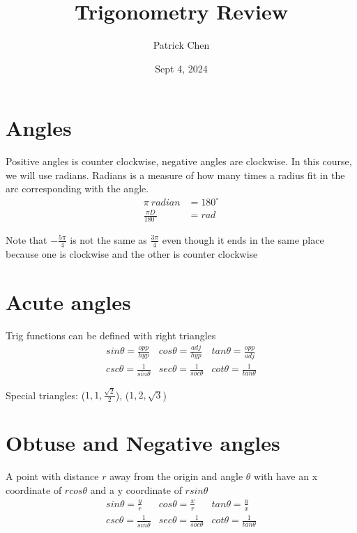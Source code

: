 \documentclass{article}
\title{Trigonometry Review}
\author{Patrick Chen}
\date{Sept 4, 2024}
\theoremstyle{mytheoremstyle}
\theoremstyle{mytheoremstyle}
\theoremstyle{myproblemstyle}
\begin{document}
    \maketitle
    \section*{Angles}
    Positive angles is counter clockwise, negative angles are clockwise. In this
    course, we will use radians. Radians is a measure of how many times a radius
    fit in the arc corresponding with the angle.
    \begin{align*}
        \pi\ radian &= 180^\circ \\
        \frac{\pi D}{180^\circ} &= rad
    \end{align*}

    Note that $-\frac{5\pi}{4}$ is not the same as $\frac{3\pi}{4}$ even though
    it ends in the same place because one is clockwise and the other is counter
    clockwise

    \section*{Acute angles}
    Trig functions can be defined with right triangles
    \begin{equation*}
        \begin{matrix}
            sin \theta = \frac{opp}{hyp} & cos \theta = \frac{adj}{hyp} & tan \theta = \frac{opp}{adj} \\
            csc\theta=\frac{1 }{sin\theta} & sec\theta=\frac{1 }{soc\theta} & cot\theta = \frac{1 }{tan\theta}
        \end{matrix}
    \end{equation*}

    Special triangles:
    ($1, 1, \frac{\sqrt{2}}{2}$), ($1, 2, \sqrt{3}$)

    \section*{Obtuse and Negative angles}
    A point with distance $r$ away from the origin and angle $\theta$ with have
    an x coordinate of $rcos\theta$ and a y coordinate of $rsin\theta$
    \begin{equation*}
        \begin{matrix}
            sin \theta = \frac{y}{r} & cos \theta = \frac{x}{r} & tan \theta = \frac{y}{x} \\
            csc\theta=\frac{1}{sin\theta} & sec\theta=\frac{1}{soc\theta} & cot\theta = \frac{1}{tan\theta}
        \end{matrix}
    \end{equation*}
\end{document}
